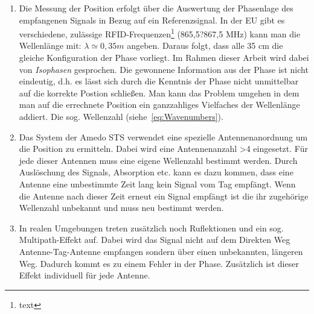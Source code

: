 \begin{enumerate}
	\item Die Messung der Position erfolgt über die Auswertung der Phasenlage des empfangenen Signals in Bezug auf ein Referenzsignal. In der EU gibt es verschiedene, zulässige RFID-Frequenzen\footnote{text} (865,5?867,5 MHz) kann man die Wellenlänge mit: $ \lambda\simeq0,35 m $ angeben. Daraus folgt, dass alle 35 cm die gleiche Konfiguration der Phase vorliegt. Im Rahmen dieser Arbeit wird dabei von \textit{Isophasen} gesprochen. Die gewonnene Information aus der Phase ist nicht eindeutig, d.h. es lässt sich durch die Kenntnis der Phase nicht unmittelbar auf die korrekte Postion schließen. Man kann das Problem umgehen in dem man auf die errechnete Position ein ganzzahliges Vielfaches der Wellenlänge addiert. Die sog. Wellenzahl (siehe~\eqref{eq:Wavenumbers}).
	\item Das System der Amedo STS verwendet eine spezielle Antennenanordnung um die Position zu ermitteln. Dabei wird eine Antennenanzahl >4 eingesetzt. Für jede dieser Antennen muss eine eigene Wellenzahl bestimmt werden. Durch Auslöschung des Signals, Absorption etc. kann es dazu kommen, dass eine Antenne eine unbestimmte Zeit lang kein Signal vom Tag empfängt. Wenn die Antenne nach dieser Zeit erneut ein Signal empfängt ist die ihr zugehörige Wellenzahl unbekannt und muss neu bestimmt werden. 
	\item In realen Umgebungen treten zusätzlich noch Ruflektionen und ein sog. Multipath-Effekt auf. Dabei wird das Signal nicht auf dem Direkten Weg Antenne-Tag-Antenne empfangen sondern über einen unbekannten, längeren Weg. Dadurch kommt es zu einem Fehler in der Phase. Zusätzlich ist dieser Effekt individuell für jede Antenne.
\end{enumerate}
\lipsum[1-2]
%


%